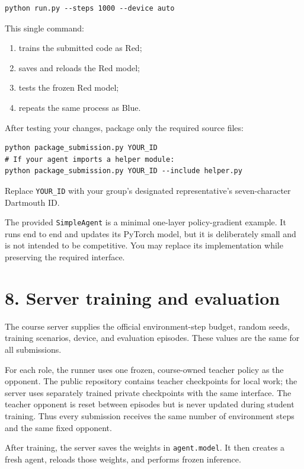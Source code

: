 \documentclass[12pt]{report}
\begin{document}
\begin{verbatim}
python run.py --steps 1000 --device auto
\end{verbatim}

This single command:

\begin{enumerate}[leftmargin=0.3in]
  \item trains the submitted code as Red;
  \item saves and reloads the Red model;
  \item tests the frozen Red model;
  \item repeats the same process as Blue.
\end{enumerate}

After testing your changes, package only the required source files:
\begin{verbatim}
python package_submission.py YOUR_ID
# If your agent imports a helper module:
python package_submission.py YOUR_ID --include helper.py
\end{verbatim}
Replace \texttt{YOUR\_ID} with your group's designated representative's
seven-character Dartmouth ID.

The provided \texttt{SimpleAgent} is a minimal one-layer policy-gradient
example. It runs end to end and updates its PyTorch model, but it is deliberately
small and is not intended to be competitive. You may replace its implementation
while preserving the required interface.

\section*{8. Server training and evaluation}

The course server supplies the official environment-step budget, random seeds,
training scenarios, device, and evaluation episodes. These values are the same
for all submissions.

For each role, the runner uses one frozen, course-owned teacher policy as the
opponent. The public repository contains teacher checkpoints for local work;
the server uses separately trained private checkpoints with the same
interface. The teacher opponent is reset between episodes but is never updated
during student training. Thus every submission receives the same number of
environment steps and the same fixed opponent.

After training, the server saves the weights in \texttt{agent.model}. It then
creates a fresh agent, reloads those weights, and performs frozen inference.
\end{document}
